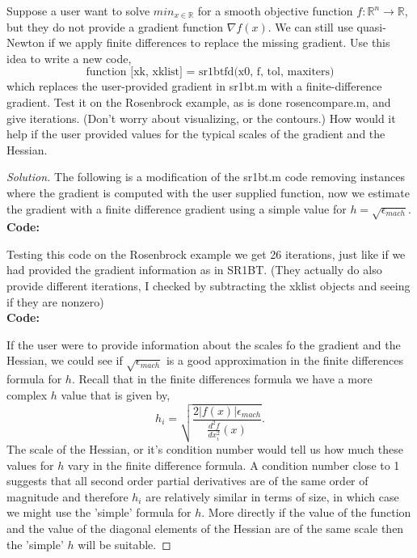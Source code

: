 \documentclass[12pt]{article}
\makeatletter
\theoremstyle{homework}
\newenvironment{exercise}[1]
{\def\@currentlabel{#1}\exercisecore}
{\endexercisecore}
\newcommand{\Reals}{\ensuremath{\mathbb R}}
\let\RR\Reals
\makeatother
\begin{document}
\begin{exercise}{P19} Suppose a user want to solve $min_{x \in \RR}$ for a smooth objective function $f: \RR^n \to \RR$, 
  but they do not provide a gradient function $\nabla f(x)$. We can still use quasi-Newton if we apply finite differences to replace
  the missing gradient. Use this idea to write a new code, 
  \begin{equation*}
    \text{function [xk, xklist] = sr1btfd(x0, f, tol, maxiters)}
  \end{equation*}
  which replaces the user-provided gradient in sr1bt.m with a finite-difference gradient. Test it on the Rosenbrock example, 
  as is done rosencompare.m, and give iterations. (Don't worry about visualizing, or the contours.) How would it help if the user 
  provided values for the typical scales of the gradient and the Hessian. 
  \begin{proof}[Solution] The following is a modification of the sr1bt.m code removing instances where the gradient is computed with the 
    user supplied function, now we estimate the gradient with a finite difference gradient using a simple value for $h = \sqrt{\epsilon_{mach}}$.\\
    
    
    \textbf{Code:}
    \begin{center}
      
    \end{center}

    Testing this code on the Rosenbrock example we get 26 iterations, just like if we had provided the gradient information 
    as in SR1BT. (They actually do also provide different iterations, I checked by subtracting the xklist objects and seeing if they are nonzero) \\

       
    \textbf{Code:}
    \begin{center}
      
    \end{center}
    
    If the user were to provide information about the scales fo the gradient and the Hessian, we could see if $\sqrt{\epsilon_{mach}}$
    is a good approximation in the finite differences formula for $h$. Recall that in the finite differences formula 
    we have a more complex $h$ value that is given by, 
    \begin{equation*}
      h_i = \sqrt{\frac{2|f(x)|\epsilon_{mach}}{\frac{d^2f}{dx_i^2}(x)}}.
    \end{equation*}
    The scale of the Hessian, or it's condition number would tell us how much these values for $h$ vary in the finite difference formula. 
    A condition number close to 1 suggests that all second order partial derivatives are of the same order of magnitude and therefore 
    $h_i$ are relatively similar in terms of size, in which case we might use the 'simple' formula for $h$. More directly if the value of the 
    function and the value of the diagonal elements of the Hessian are of the same scale then the 'simple' $h$ will be suitable. 
  \end{proof}
\end{exercise}
\end{document}
